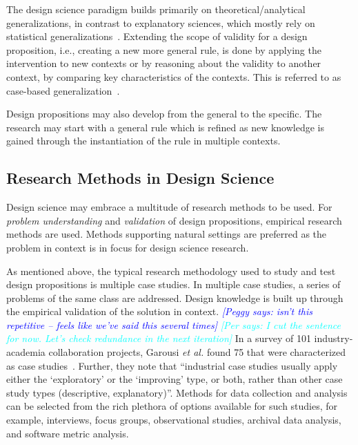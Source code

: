 \documentclass[graybox]{svmult}
\newcommand{\peggy}[1]{\textcolor{blue}{{\it [Peggy says: #1]}}}
\newcommand{\per}[1]{\textcolor{cyan}{{\it [Per says: #1]}}}
\newcommand{\peggy}[1]{}
\newcommand{\per}[1]{}
\begin{document}
The design science paradigm builds primarily on theoretical/analytical generalizations, in contrast to explanatory sciences, which mostly rely on statistical generalizations~\cite[p. 30]{Runeson12Case}. Extending the scope of validity for a design proposition, i.e., creating a new more general rule, is done by applying the intervention to new contexts or by reasoning about the validity to another context, by comparing key characteristics of the contexts. This is referred to as case-based generalization~\cite{wieringa_six_2015}.  

Design propositions may also develop from the general to the specific. The research may start with a general rule which is refined as new knowledge is gained through the instantiation of the rule in multiple contexts. 


\subsection{Research Methods in Design Science} 


Design science may embrace a multitude of research methods to be used. For \emph{problem understanding} and \emph{validation} of design propositions, empirical research methods are used. Methods supporting natural settings are preferred as the problem in context is in focus for design science research. 

As mentioned above, the typical research methodology used to study and test design propositions is multiple case studies. In multiple case studies, a series of problems of the same class are addressed. Design knowledge is built up through the empirical validation of the solution in context. %
\peggy{isn't this repetitive -- feels like we've said this several times} \per{I cut the sentence for now. Let's check redundance in the next iteration}
In a survey of 101 industry-academia collaboration projects, Garousi \emph{et al.} found 75 that were characterized as case studies~\cite{Garousi2019}. Further, they note that ``industrial case studies usually apply either the `exploratory' or the `improving' type, or both, rather than other case study types (descriptive, explanatory)''. Methods for data collection and analysis can be selected from the rich plethora of options available for such studies, for example, interviews, focus groups, observational studies, archival data analysis, and software metric analysis. 
\end{document}
